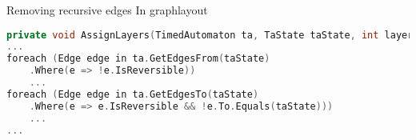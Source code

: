 \begin{frame}[fragile]{Removing recursive edges}
    In graphlayout
    \begin{lstlisting}[language=c++,basicstyle=\tiny]
private void AssignLayers(TimedAutomaton ta, TaState taState, int layerIndex)
...
foreach (Edge edge in ta.GetEdgesFrom(taState)
    .Where(e => !e.IsReversible))
    ...
foreach (Edge edge in ta.GetEdgesTo(taState)
    .Where(e => e.IsReversible && !e.To.Equals(taState)))
    ...
...
    \end{lstlisting}
\end{frame}